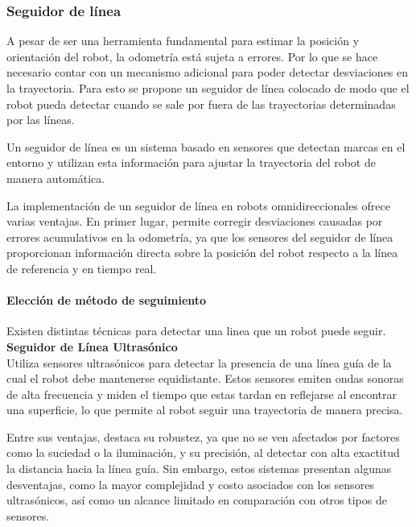 \subsubsection{Seguidor de línea}

A pesar de ser una herramienta fundamental para estimar la posición y orientación del robot, la odometría está sujeta a errores. Por lo que se hace necesario contar con un mecanismo adicional para poder detectar desviaciones en la trayectoria. Para esto se propone un seguidor de línea colocado de modo que el robot pueda detectar cuando se sale por fuera de las trayectorias determinadas por las líneas.

Un seguidor de línea es un sistema basado en sensores que detectan marcas en el entorno y utilizan esta información para ajustar la trayectoria del robot de manera automática.

La implementación de un seguidor de línea en robots omnidireccionales ofrece varias ventajas. En primer lugar, permite corregir desviaciones causadas por errores acumulativos en la odometría, ya que los sensores del seguidor de línea proporcionan información directa sobre la posición del robot respecto a la línea de referencia y en tiempo real.


\paragraph{Elección de método de seguimiento} \mbox{} \vspace{6pt}

Existen distintas técnicas para detectar una linea que un robot puede seguir. \\

\textbf{Seguidor de Línea Ultrasónico} \mbox{} \vspace{6pt} \\
Utiliza sensores ultrasónicos para detectar la presencia de una línea guía de la cual el robot debe mantenerse equidistante. Estos sensores emiten ondas sonoras de alta frecuencia y miden el tiempo que estas tardan en reflejarse al encontrar una superficie, lo que permite al robot seguir una trayectoria de manera precisa.

Entre sus ventajas, destaca su robustez, ya que no se ven afectados por factores como la suciedad o la iluminación, y su precisión, al detectar con alta exactitud la distancia hacia la línea guía. Sin embargo, estos sistemas presentan algunas desventajas, como la mayor complejidad y costo asociados con los sensores ultrasónicos, así como un alcance limitado en comparación con otros tipos de sensores. \cite{venkateshrfidultrasonic} \cite{aungultrasonic} \\


